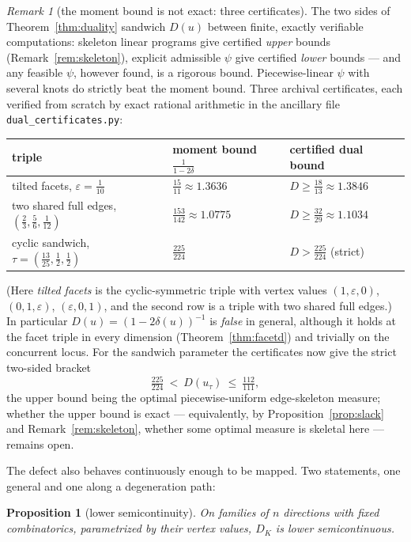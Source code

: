 \documentclass{aims}
\numberwithin{equation}{section}
\theoremstyle{plain}
\newtheorem{proposition}[theorem]{Proposition}
\theoremstyle{definition}
\theoremstyle{remark}
\newtheorem{remark}[theorem]{Remark}
\begin{document}
\begin{remark}[the moment bound is not exact: three certificates]
\label{rem:sandwich}
The two sides of Theorem~\ref{thm:duality} sandwich $D(u)$ between finite,
exactly verifiable computations: skeleton linear programs give certified
\emph{upper} bounds (Remark~\ref{rem:skeleton}), explicit admissible $\psi$
give certified \emph{lower} bounds --- and any feasible $\psi$, however
found, is a rigorous bound. Piecewise-linear $\psi$ with several knots do
strictly beat the moment bound. Three archival certificates, each verified
from scratch by exact rational arithmetic in the ancillary file
\texttt{dual\_certificates.py}:
\begin{center}
\begin{tabular}{@{}lll@{}}
\hline
triple & moment bound $\tfrac1{1-2\delta}$ & certified dual bound\\
\hline
tilted facets, $\varepsilon=\tfrac1{10}$ & $\tfrac{15}{11}\approx1.3636$
 & $D\ge\tfrac{18}{13}\approx1.3846$\\
two shared full edges, $(\tfrac23,\tfrac56,\tfrac1{12})$
 & $\tfrac{153}{142}\approx1.0775$ & $D\ge\tfrac{32}{29}\approx1.1034$\\
cyclic sandwich, $\tau=(\tfrac{13}{25},\tfrac12,\tfrac12)$
 & $\tfrac{225}{224}$ & $D>\tfrac{225}{224}$ (strict)\\
\hline
\end{tabular}
\end{center}
(Here \emph{tilted facets} is the cyclic-symmetric triple with vertex values
$(1,\varepsilon,0)$, $(0,1,\varepsilon)$, $(\varepsilon,0,1)$, and the
second row is a triple with two shared full edges.) In particular
$D(u)=(1-2\delta(u))^{-1}$ is \emph{false} in general, although it holds at
the facet triple in every dimension (Theorem~\ref{thm:facetd}) and trivially
on the concurrent locus. For the sandwich parameter the certificates now
give the strict two-sided bracket
\[
\tfrac{225}{224}\ <\ D(u_\tau)\ \le\ \tfrac{112}{111},
\]
the upper bound being the optimal piecewise-uniform edge-skeleton measure;
whether the upper bound is exact --- equivalently, by
Proposition~\ref{prop:slack} and Remark~\ref{rem:skeleton}, whether some
optimal measure is skeletal here --- remains open.
\end{remark}

The defect also behaves continuously enough to be mapped. Two statements,
one general and one along a degeneration path:

\begin{proposition}[lower semicontinuity]\label{prop:lsc}
On families of $n$ directions with fixed combinatorics, parametrized by
their vertex values, $D_K$ is lower semicontinuous.
\end{proposition}
\end{document}
